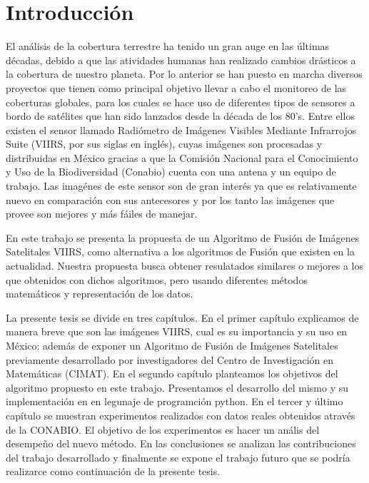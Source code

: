 \chapter{Introducción}

El análisis de la cobertura terrestre ha tenido un gran auge en las últimas décadas, debido a que las atividades humanas han realizado cambios drásticos a la cobertura de nuestro planeta. Por lo anterior se han puesto en marcha diversos proyectos que tienen como principal objetivo llevar a cabo el monitoreo de las coberturas globales, para los cuales se hace uso de diferentes tipos de sensores a bordo de satélites que han sido lanzados desde la década de los 80's. Entre ellos existen el sensor llamado Radiómetro de Imágenes Visibles Mediante Infrarrojos Suite (VIIRS, por sus siglas en inglés), cuyas imágenes son procesadas y distribuidas en México gracias a que la Comisión Nacional para el Conocimiento y Uso de la Biodiversidad (Conabio) cuenta con una antena y un equipo de trabajo. Las imagénes de este sensor son de gran interés ya que es relativamente nuevo en comparación con sus antecesores y por los tanto las imágenes que provee son mejores y más fáiles de manejar. 

En este trabajo se presenta la propuesta de un Algoritmo de Fusión de Imágenes Satelitales VIIRS, como alternativa a los algoritmos de Fusión que existen en la actualidad. Nuestra propuesta busca obtener resulatados similares o mejores a los que obtenidos con dichos algoritmos, pero usando diferentes métodos matemáticos y representación de los datos.

La presente tesis se divide en tres capítulos. En el primer capítulo explicamos de manera breve que son las imágenes VIIRS, cual es su importancia y su uso en México; además de exponer un Algoritmo de Fusión de Imágenes Satelitales previamente desarrollado por investigadores del Centro de Investigación en Matemáticas (CIMAT). En el segundo capítulo planteamos los objetivos del algoritmo propuesto en este trabajo. Presentamos el desarrollo del mismo y su implementación en en legunaje de programción python. En el tercer y último capítulo se muestran experimentos realizados con datos reales obtenidos através de la CONABIO. El objetivo de los experimentos es hacer un anális del desempeño del nuevo método. En las conclusiones se analizan las contribuciones del trabajo desarrollado y finalmente se expone el trabajo futuro que se podría realizarce como continuación de la presente tesis.
